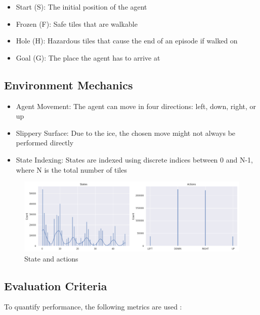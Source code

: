 \documentclass[conference]{IEEEtran}
\begin{document}
\begin{itemize}
\item Start (S): The initial position of the agent \cite{Brockman2016}
\item Frozen (F): Safe tiles that are walkable \cite{SuttonBarto2018}
\item Hole (H): Hazardous tiles that cause the end of an episode if walked on \cite{Brockman2016}
\item Goal (G): The place the agent has to arrive at \cite{SuttonBarto2018}
\end{itemize}

\subsection{Environment Mechanics}
\begin{itemize}
\item Agent Movement: The agent can move in four directions: left, down, right, or up \cite{Brockman2016}
\item Slippery Surface: Due to the ice, the chosen move might not always be performed directly \cite{SuttonBarto2018}
\item State Indexing: States are indexed using discrete indices between 0 and N-1, where N is the total number of tiles \cite{Brockman2016}
\end{itemize}

\begin{figure}[H]
    \centering
    \begin{minipage}{0.48\textwidth}
        \centering
        \includegraphics[width=\linewidth]{State and actions.png}
        \caption{State and actions}
        \label{fig:State_and_actions}
    \end{minipage}
    \hfill
\end{figure}

\subsection{Evaluation Criteria}
To quantify performance, the following metrics are used \cite{Henderson2018}:
\end{document}
